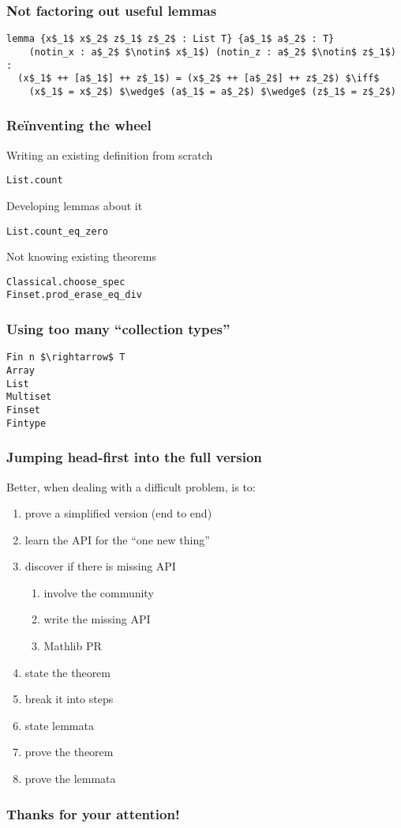 \documentclass{beamer}
\begin{document}
\begin{frame}[fragile]
\frametitle{Not factoring out useful lemmas}
\begin{lstlisting}
lemma {x$_1$ x$_2$ z$_1$ z$_2$ : List T} {a$_1$ a$_2$ : T}
    (notin_x : a$_2$ $\notin$ x$_1$) (notin_z : a$_2$ $\notin$ z$_1$) :
  (x$_1$ ++ [a$_1$] ++ z$_1$) = (x$_2$ ++ [a$_2$] ++ z$_2$) $\iff$
    (x$_1$ = x$_2$) $\wedge$ (a$_1$ = a$_2$) $\wedge$ (z$_1$ = z$_2$)
\end{lstlisting}
\end{frame}

\begin{frame}[fragile]
\frametitle{Reïnventing the wheel}
Writing an existing definition from scratch
\begin{lstlisting}
List.count
\end{lstlisting}
\pause
Developing lemmas about it
\begin{lstlisting}
List.count_eq_zero
\end{lstlisting}
\pause
Not knowing existing theorems
\begin{lstlisting}
Classical.choose_spec
Finset.prod_erase_eq_div
\end{lstlisting}
\end{frame}

\begin{frame}[fragile]
\frametitle{Using too many ``collection types''}
\begin{lstlisting}
Fin n $\rightarrow$ T
Array
List
Multiset
Finset
Fintype
\end{lstlisting}
\end{frame}

\begin{frame}
\frametitle{Jumping head-first into the full version}
Better, when dealing with a difficult problem, is to:
\begin{enumerate}
\pause \item prove a simplified version (end to end)
\pause \item learn the API for the ``one new thing''
\pause \item discover if there is missing API
\begin{enumerate} \pause
	\item involve the community
	\item write the missing API
	\item Mathlib PR
\end{enumerate}
\pause \item state the theorem
\pause \item break it into steps
\pause \item state lemmata
\pause \item prove the theorem
\pause \item prove the lemmata
\end{enumerate}
\end{frame}

\begin{frame}
\frametitle{Thanks for your attention!}

\end{frame}
\end{document}
